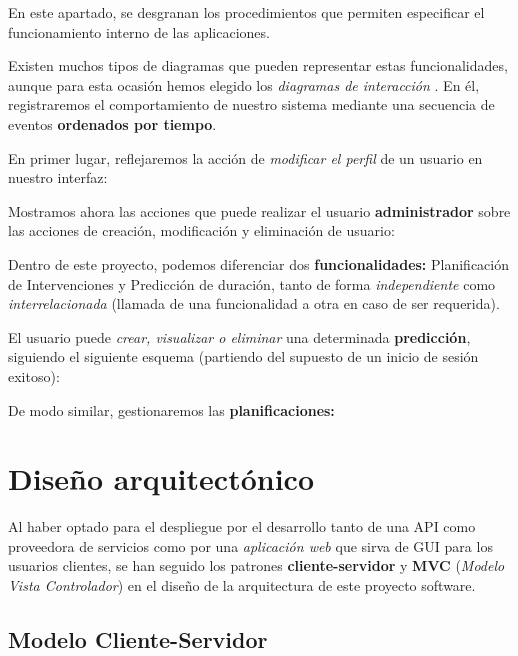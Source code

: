 En este apartado, se desgranan los procedimientos que permiten especificar el funcionamiento interno de las aplicaciones.

Existen muchos tipos de diagramas que pueden representar estas funcionalidades, aunque para esta ocasión hemos elegido los \textit{diagramas de interacción}  \cite{Britton2005IdentifyingDiagrams}. En él, registraremos el comportamiento de nuestro sistema mediante una secuencia de eventos \textbf{ordenados por tiempo}.

En primer lugar, reflejaremos la acción de \textit{modificar el perfil} de un usuario en nuestro interfaz:


Mostramos ahora las acciones que puede realizar el usuario \textbf{administrador} sobre las acciones de creación, modificación y eliminación de usuario:


Dentro de este proyecto, podemos diferenciar dos \textbf{funcionalidades:} Planificación de Intervenciones y Predicción de duración, tanto de forma \textit{independiente} como \textit{interrelacionada} (llamada de una funcionalidad a otra en caso de ser requerida).

El usuario puede \textit{crear, visualizar o eliminar} una determinada \textbf{predicción}, siguiendo el siguiente esquema (partiendo del supuesto de un inicio de sesión exitoso):


De modo similar, gestionaremos las \textbf{planificaciones:}




\section{Diseño arquitectónico}

Al haber optado para el despliegue por el desarrollo tanto de una API como proveedora de servicios como por una \textit{aplicación web} que sirva de GUI para los usuarios clientes, se han seguido los patrones \textbf{cliente-servidor} y \textbf{MVC} (\textit{Modelo Vista Controlador}) en el diseño de la arquitectura de este proyecto software.

\subsection{Modelo Cliente-Servidor}

